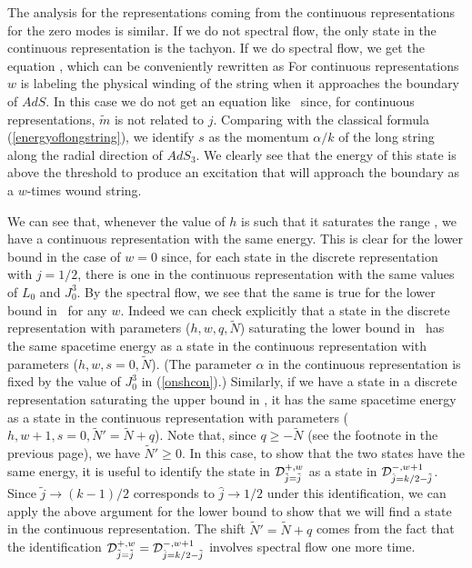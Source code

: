 The analysis for the representations coming from the continuous 
representations for the zero modes is similar. 
If we do not spectral flow, the only state in the continuous 
representation is the tachyon. 
If we do spectral flow, we get the equation \onshell , which 
can be conveniently rewritten as 
For continuous representations $w$ is labeling the physical winding
of the string when it approaches the boundary of $AdS$. 
In this case we do not get an equation like \spectfl\ since,
for continuous representations,  
$\tilde m$ is not related to $j$. 
Comparing with the classical formula
(\ref{energyoflongstring}), we
identify $s$ as the momentum $\alpha/k$ of the long string
along the radial direction of $AdS_3$.
We clearly see that the energy of this state is above the threshold to 
produce an excitation that will approach the boundary as a $w$-times wound
string.

We can see that, whenever the value of $h$ is such that it
saturates the range \rangenew , we have a continuous representation 
with the same energy. This is clear for the lower bound in
the case of $w=0$ since, for each state in the discrete 
representation with $j=1/2$, there is one in the continuous 
representation with the same values of $L_0$ and
$J_0^3$. By the spectral flow, we see that the same is true for the
lower bound in \rangenew\ for any $w$. Indeed we can
check explicitly that a state in the discrete representation with
parameters ($h,w,q,\tilde{N}$) saturating the lower bound
in \rangenew\ has the same spacetime energy as a state in the 
continuous representation with parameters ($h,w,s=0,\tilde{N}$).
(The parameter $\alpha$ in the continuous representation
is fixed by the value of $J_0^3$ in (\ref{onshcon}).)
Similarly, if we have a state in a  discrete representation
saturating the upper bound in \rangenew , it has the
same spacetime energy as a state in the continuous representation
with parameters ($h,w+1,s=0, \tilde{N}'=\tilde{N}+q$). 
Note that, since $q\geq -\tilde{N}$ (see
the footnote in the previous page), we have $\tilde{N}' \geq 0$. In this case,
to show that the two states have the same energy, it is useful to 
identify the state in ${\cal D}^{+,w}_{\tilde j = \tilde j}$ 
as a state in ${\cal D}^{-,w+1}_{\hat j = k/2-\tilde j}$.
Since $\tilde j \to (k-1)/2$ corresponds to $\hat j \to 1/2$
under this identification, we can apply the above argument for 
the lower bound to show that we will find a state in the continuous 
representation. The shift $\tilde{N}' = \tilde{N} + q$ comes 
from the fact that 
the identification ${\cal D}^{+,w}_{\tilde j = \tilde j}= 
{\cal D}^{-,w+1}_{\hat j = k/2-\tilde j}$ involves 
spectral flow one more time. 

